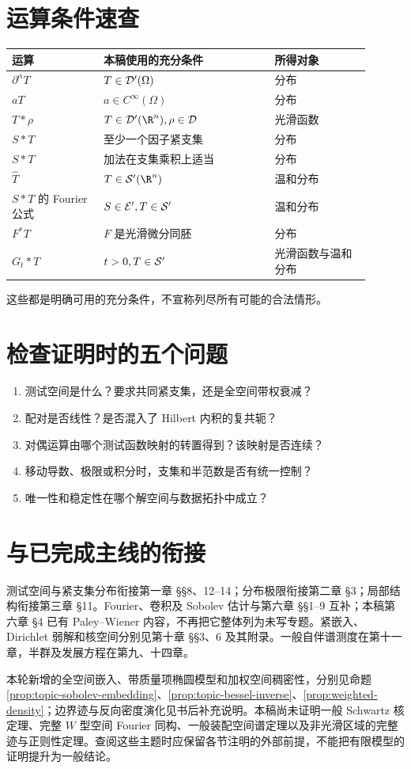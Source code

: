 \section{运算条件速查}
\begin{center}\small
\begin{tabular}{p{0.23\linewidth}p{0.43\linewidth}p{0.24\linewidth}}
\toprule
运算 & 本稿使用的充分条件 & 所得对象\\\midrule
$\partial^\alpha T$ & $T\in\mathcal{D}'(\Omega)$ & 分布\\
$aT$ & $a\in C^\infty(\Omega)$ & 分布\\
$T*\rho$ & $T\in\Dist(\R^n),\rho\in\Test$ & 光滑函数\\
$S*T$ & 至少一个因子紧支集 & 分布\\
$S*T$ & 加法在支集乘积上适当 & 分布\\
$\widehat T$ & $T\in\Temp(\R^n)$ & 温和分布\\
$S*T$ 的 Fourier 公式 & $S\in\mathcal{E}',T\in\mathcal{S}'$ & 温和分布\\
$F^*T$ & $F$ 是光滑微分同胚 & 分布\\
$G_t*T$ & $t>0,T\in\mathcal{S}'$ & 光滑函数与温和分布\\
\bottomrule
\end{tabular}
\end{center}
这些都是明确可用的充分条件，不宣称列尽所有可能的合法情形。

\section{检查证明时的五个问题}
\begin{enumerate}
\item 测试空间是什么？要求共同紧支集，还是全空间带权衰减？
\item 配对是否线性？是否混入了 Hilbert 内积的复共轭？
\item 对偶运算由哪个测试函数映射的转置得到？该映射是否连续？
\item 移动导数、极限或积分时，支集和半范数是否有统一控制？
\item 唯一性和稳定性在哪个解空间与数据拓扑中成立？
\end{enumerate}

\section{与已完成主线的衔接}
测试空间与紧支集分布衔接第一章 §§8、12--14；分布极限衔接第二章 §3；局部结构衔接第三章 §11。Fourier、卷积及 Sobolev 估计与第六章 §§1--9 互补；本稿第六章 §4 已有 Paley--Wiener 内容，不再把它整体列为未写专题。紧嵌入、Dirichlet 弱解和核空间分别见第十章 §§3、6 及其附录。一般自伴谱测度在第十一章，半群及发展方程在第九、十四章。

本轮新增的全空间嵌入、带质量项椭圆模型和加权空间稠密性，分别见命题 \ref{prop:topic-sobolev-embedding}、\ref{prop:topic-bessel-inverse}、\ref{prop:weighted-density}；边界迹与反向密度演化见书后补充说明。本稿尚未证明一般 Schwartz 核定理、完整 $W$ 型空间 Fourier 同构、一般装配空间谱定理以及非光滑区域的完整迹与正则性定理。查阅这些主题时应保留各节注明的外部前提，不能把有限模型的证明提升为一般结论。
